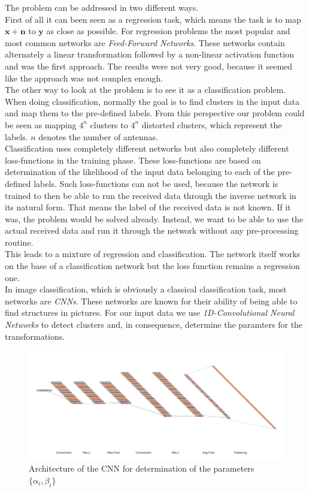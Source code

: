 \documentclass[oneside]{msvreport}%
\newcommand{\B}[1]{\boldsymbol{#1}}
\newcommand{\e}[1]{\emph{#1}}
\begin{document}
\noindent The problem can be addressed in two different ways. \\
First of all it can been seen as a regression task, which means the task is to map $\B{x} + \B{n}$ to $\B{y}$ as close as possible. For regression problems the most popular and most common networks are \e{Feed-Forward Networks}. These networks contain alternately a linear transformation followed by a non-linear activation function and was the first approach. The results were not very good, because it seemed like the approach was not complex enough.\\
The other way to look at the problem is to see it as a classification problem. When doing classification, normally the goal is to find clusters in the input data and map them to the pre-defined labels. From this perspective our problem could be seen as mapping $4^n$ clusters to $4^n$ distorted clusters, which represent the labels. $n$ denotes the number of antennas. \\
Classification uses completely different networks but also completely different loss-functions in the training phase. These loss-functions are based on determination of the likelihood of the input data belonging to each of the pre-defined labels. Such loss-functions can not be used, because the network is trained to then be able to run the received data through the inverse network in its natural form. That means the label of the received data is not known. If it was, the problem would be solved already. Instead, we want to be able to use the actual received data and run it through the network without any pre-processing routine.\\
This leads to a mixture of regression and classification. The network itself works on the base of a classification network but the loss function remains a regression one.\\ 
In image classification, which is obviously a classical classification task, most networks are \e{CNNs}. These networks are known for their ability of being able to find structures in pictures. For our input data we use \e{1D-Convolutional Neural Networks} to detect clusters and, in consequence, determine the paramters for the transformations.\\

\begin{figure}
  \centering
  \includegraphics[scale=0.4]{structure_CNN.png}
  \caption{Architecture of the CNN for determination of the parameters $\{\alpha_i, \beta_i\}$}
  \label{fig:structure_CNN}
\end{figure}
\end{document}
